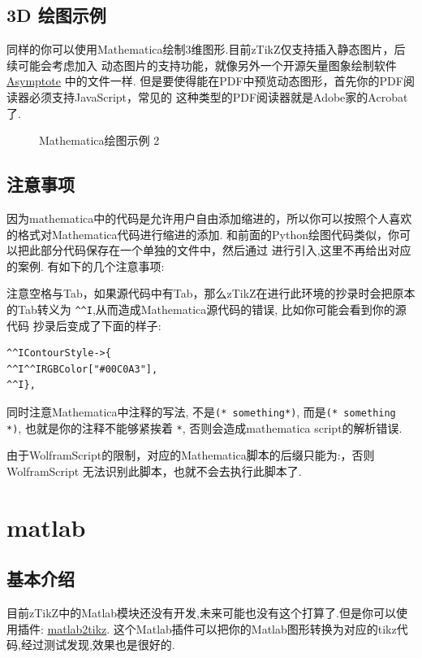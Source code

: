 \subsection{3D 绘图示例}
同样的你可以使用Mathematica绘制3维图形.目前zTikZ仅支持插入静态图片，后续可能会考虑加入 
动态图片的支持功能，就像另外一个开源矢量图象绘制软件\href{https://asymptote.sourceforge.io/}{Asymptote}
中的文件一样. 但是要使得能在PDF中预览动态图形，首先你的PDF阅读器必须支持JavaScript，常见的
这种类型的PDF阅读器就是Adobe家的Acrobat了.

\begin{figure}[!htb]
    \centering
    
    \caption{Mathematica绘图示例 2}
    \label{fig:mma-fig-2}
\end{figure}

\subsection{注意事项}
因为mathematica中的代码是允许用户自由添加缩进的，所以你可以按照个人喜欢的格式对Mathematica代码进行缩进的添加.
和前面的Python绘图代码类似，你可以把此部分代码保存在一个单独的文件中，然后通过\cmd{}
进行引入,这里不再给出对应的案例. 有如下的几个注意事项:

注意空格与Tab，如果源代码中有Tab，那么zTikZ在进行此环境的抄录时会把原本
的Tab转义为 \verb|^^I|,从而造成Mathematica源代码的错误, 比如你可能会看到你的源代码
抄录后变成了下面的样子:

\begin{verbatim}
^^IContourStyle->{
^^I^^IRGBColor["#00C0A3"], 
^^I},
\end{verbatim}

同时注意Mathematica中注释的写法, 不是\verb|(* something*)|, 而是\verb|(* something *)|,
也就是你的注释不能够紧挨着 \verb|*|, 否则会造成mathematica script的解析错误.

由于WolframScript的限制，对应的Mathematica脚本的后缀只能为:，否则WolframScript
无法识别此脚本，也就不会去执行此脚本了.


\section{matlab}
\subsection{基本介绍}
目前zTikZ中的Matlab模块还没有开发,未来可能也没有这个打算了.但是你可以使用插件: \href{https://github.com/matlab2tikz/matlab2tikz}{matlab2tikz}.
这个Matlab插件可以把你的Matlab图形转换为对应的tikz代码,经过测试发现,效果也是很好的.

